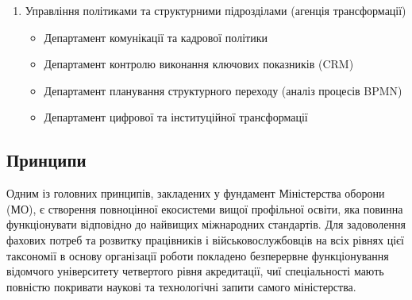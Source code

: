 \begin{enumerate}
\begin{itemize}
\begin{itemize}
            \item Командування Військово-Морських сил
            \item Командування спеціальних та допоміжних сил (ССО, Морська піхота, РЕБ, РХБЗ, ТРО)
            \item Командування кібербезпеки та ДШВ
        \end{itemize}
        \item Департамент контролю й оперативного управління DFR (див. Додаток 4)
        \item Економічний департамент
        \begin{itemize}
            \item Відділ матеріально-ресурсного забезпечення (WMS)
            \item Відділ бюджетування і закупівель
        \end{itemize}
    \end{itemize}
    \item Управління політиками та структурними підрозділами (агенція трансформації)
    \begin{itemize}
        \item Департамент комунікації та кадрової політики
        \item Департамент контролю виконання ключових показників (CRM)
        \item Департамент планування структурного переходу (аналіз процесів BPMN)
        \item Департамент цифрової та інституційної трансформації
    \end{itemize}
\end{enumerate}

\subsection*{Принципи}

Одним із головних принципів, закладених у фундамент Міністерства оборони (МО), є створення повноцінної екосистеми вищої профільної освіти, яка повинна функціонувати відповідно до найвищих міжнародних стандартів. Для задоволення фахових потреб та розвитку працівників і військовослужбовців на всіх рівнях цієї таксономії в основу організації роботи покладено безперервне функціонування відомчого університету четвертого рівня акредитації, чиї спеціальності мають повністю покривати наукові та технологічні запити самого міністерства.

